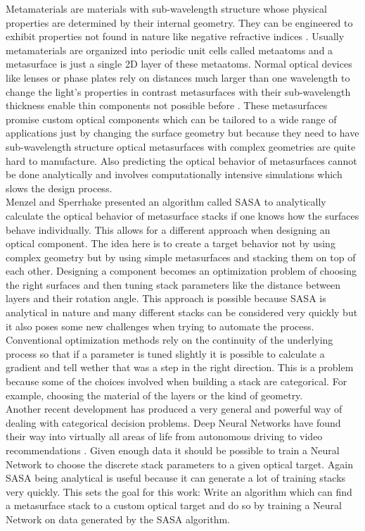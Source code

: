 Metamaterials are materials with sub-wavelength structure whose physical properties are determined by their internal geometry. They can be engineered to exhibit properties not found in nature like negative refractive indices \cite{Shelby2001}.
Usually metamaterials are organized into periodic unit cells called metaatoms and a metasurface is just a single 2D layer of these metaatoms.
Normal optical devices like lenses or phase plates rely on distances much larger than one wavelength to change the light's properties in contrast metasurfaces with their sub-wavelength thickness enable thin components not possible before \cite{Yu2014}.
These metasurfaces promise custom optical components which can be tailored to a wide range of applications just by changing the surface geometry
but because they need to have sub-wavelength structure optical metasurfaces with complex geometries are quite hard to manufacture. Also predicting the optical behavior of metasurfaces cannot be done analytically and involves computationally intensive simulations which slows the design process. 
\\

 Menzel and Sperrhake \cite{Menzel2016} presented an algorithm called SASA to analytically calculate the optical behavior of metasurface stacks if one knows how the surfaces behave individually. This allows for a different approach when designing an optical component. The idea here is to create a target behavior not by using complex geometry but by using simple metasurfaces and stacking them on top of each other. Designing a component becomes an optimization problem of choosing the right surfaces and then tuning stack parameters like the distance between layers and their rotation angle. This approach is possible because SASA is analytical in nature and many different stacks can be considered very quickly but it also poses some new challenges when trying to automate the process. Conventional optimization methods rely on the continuity of the underlying process so that if a parameter is tuned slightly it is possible to calculate a gradient and tell wether that was a step in the right direction. This is a problem because some of the choices involved when building a stack are categorical. For example, choosing the material of the layers or the kind of geometry.
\\

\indent
Another recent development has produced a very general and powerful way of dealing with categorical decision problems. Deep Neural Networks have found their way into virtually all areas of life from autonomous driving \cite{Dequaire2016} to video recommendations \cite{youtube}. Given enough data it should be possible to train a Neural Network to choose the discrete stack parameters to a given optical target. Again SASA being analytical is useful because it can generate a lot of training stacks very quickly. This sets the goal for this work: Write an algorithm which can find a metasurface stack to a custom optical target and do so by training a Neural Network on data generated by the SASA algorithm.
\\


